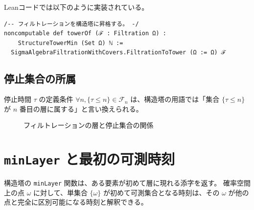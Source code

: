 \documentclass[a4paper,11pt]{article}
\theoremstyle{definition}
\theoremstyle{plain}
\begin{document}
Leanコードでは以下のように実装されている。

\begin{lstlisting}[caption=フィルトレーションの構造塔化]
/-- フィルトレーションを構造塔に昇格する。 -/
noncomputable def towerOf (ℱ : Filtration Ω) :
    StructureTowerMin (Set Ω) ℕ :=
  SigmaAlgebraFiltrationWithCovers.FiltrationToTower (Ω := Ω) ℱ
\end{lstlisting}

\subsection{停止集合の所属}
停止時間 $\tau$ の定義条件 $\forall n, \{ \tau \le n \} \in \mathcal{F}_n$ は、構造塔の用語では「集合 $\{ \tau \le n \}$ が $n$ 番目の層に属する」と言い換えられる。

\begin{figure}[htbp]
\centering
{}
\caption{フィルトレーションの層と停止集合の関係}
\end{figure}

\section{\texttt{minLayer} と最初の可測時刻}

構造塔の \texttt{minLayer} 関数は、ある要素が初めて層に現れる添字を返す。
確率空間上の点 $\omega$ に対して、単集合 $\{\omega\}$ が初めて可測集合となる時刻は、その $\omega$ が他の点と完全に区別可能になる時刻と解釈できる。
\end{document}
